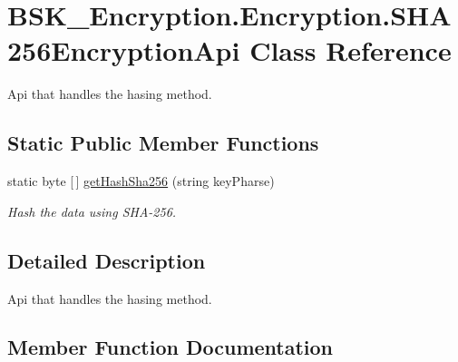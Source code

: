 \hypertarget{class_b_s_k___encryption_1_1_encryption_1_1_s_h_a256_encryption_api}{}\section{B\+S\+K\+\_\+\+Encryption.\+Encryption.\+S\+H\+A256\+Encryption\+Api Class Reference}
\label{class_b_s_k___encryption_1_1_encryption_1_1_s_h_a256_encryption_api}


Api that handles the hasing method.  


\subsection*{Static Public Member Functions}
\begin{DoxyCompactItemize}
\item 
static byte \mbox{[}$\,$\mbox{]} \mbox{\hyperlink{class_b_s_k___encryption_1_1_encryption_1_1_s_h_a256_encryption_api_a3892e8fa36b63070cae039ac8d2981eb}{get\+Hash\+Sha256}} (string key\+Pharse)
\begin{DoxyCompactList}\small\item\em Hash the data using S\+H\+A-\/256. \end{DoxyCompactList}\end{DoxyCompactItemize}


\subsection{Detailed Description}
Api that handles the hasing method. 



\subsection{Member Function Documentation}
\mbox{\label{class_b_s_k___encryption_1_1_encryption_1_1_s_h_a256_encryption_api_a3892e8fa36b63070cae039ac8d2981eb}} 
